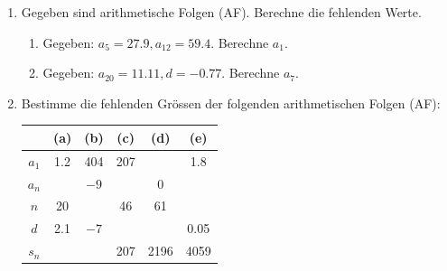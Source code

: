 \clearpage
\begin{ueb}{}{}
    \begin{enumerate}
        
    \item Gegeben sind arithmetische Folgen (AF). Berechne die fehlenden Werte.
    \begin{enumerate}
        \item Gegeben: $a_5 = 27.9, a_{12} = 59.4$. Berechne $a_1$.
        \item Gegeben: $a_{20} = 11.11, d = -0.77$. Berechne $a_7$.
    \end{enumerate}
    
    \item Bestimme die fehlenden Grössen der folgenden arithmetischen Folgen (AF):
    

    \begin{center}
        \begin{tabular}{|c|c|c|c|c|c|}
        \hline
         & (a) & (b) & (c) & (d) & (e)  \\
        \hline
        $a_1$ & 1.2 & 404 &207 & & 1.8\\
        \hline
        $a_n$ & & $-9$ & & 0 &  \\
        \hline
        $n$ & 20 & & 46 & 61 &  \\
        \hline
        $d$ & 2.1 & $-7$ & & & 0.05  \\
        \hline
        $s_n$ & & & 207 & 2196 & 4059  \\
        \hline
        \end{tabular}
        \end{center}
    

\end{enumerate}
\end{ueb}

